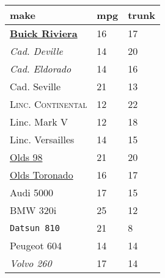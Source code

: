 \documentclass{article}
\begin{document}
\begin{table}[tbp] \centering
{}

\begin{tabularx}{\linewidth}{lCC}

\toprule
{make}&{mpg}&{trunk} \tabularnewline
\midrule\addlinespace[1.5ex]
\underline{\textbf{Buick Riviera}}&16&17 \tabularnewline
\textsl{Cad. Deville}&14&20 \tabularnewline
\textit{Cad. Eldorado}&14&16 \tabularnewline
Cad. Seville&21&13 \tabularnewline
\textsc{Linc. Continental}&12&22 \tabularnewline
\textsf{Linc. Mark V}&12&18 \tabularnewline
Linc. Versailles&14&15 \tabularnewline
\underline{Olds 98}&21&20 \tabularnewline
\underline{Olds Toronado}&16&17 \tabularnewline
Audi 5000&17&15 \tabularnewline
BMW 320i&25&12 \tabularnewline
\texttt{Datsun 810}&21&8 \tabularnewline
Peugeot 604&14&14 \tabularnewline
\emph{Volvo 260}&17&14 \tabularnewline
\bottomrule 

\end{tabularx}
\end{table}
\end{document}
